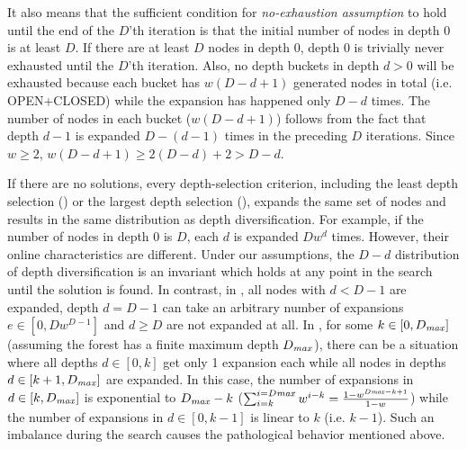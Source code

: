 It also means that the sufficient condition for \emph{no-exhaustion assumption} to hold until the end of the $D$'th
iteration is that the initial number of nodes in depth 0 is at least $D$.  If there are at least $D$ nodes in depth
0, depth 0 is trivially never exhausted until the $D$'th iteration. Also, no depth buckets in depth $d>0$ will be exhausted 
because each bucket has $w(D-d+1)$ generated nodes in total (i.e. OPEN+CLOSED) while the expansion has
happened only $D-d$ times.
The number of nodes in each bucket ($w(D-d+1)$) follows from the fact that  depth $d-1$ is expanded $D-(d-1)$ times in the preceding $D$ iterations.
Since $w\geq 2$, $w(D-d+1)\geq 2(D-d)+2>D-d$.

If there are no solutions, every depth-selection criterion, including the least depth selection (\fifo) or the largest depth selection (\lifo), expands the same set of nodes and results in the same distribution as depth diversification.
For example, if the number of nodes in depth 0 is $D$, each $d$ is expanded $Dw^d$ times.
However, their online characteristics are different.
Under our assumptions, the $D-d$ distribution of depth diversification is an invariant which holds at any point in the search until the solution is found.
In contrast, in \fifo, all nodes with $d<D-1$ are expanded, depth $d=D-1$ can take an arbitrary number of expansions $e \in [0, Dw^{D-1}]$ and $d\geq D$ are not expanded at all.
In \lifo, for some $k\in [0,D_\mit{max}]$ (assuming the forest has a finite maximum depth $D_\mit{max}$), there can be a situation where all depths $d \in [0,k]$ get only 1 expansion each
while all nodes in depths $d \in [k+1,D_\mit{max}]$ are expanded. In this case, the number of expansions in $d \in [k,D_\mit{max}]$ is exponential to $D_\mit{max}-k$ ($\sum_{i=k}^{i=D\mit{max}}w^{i-k}=\frac{1-w^{D\mit{max}-k+1}}{1-w}$) while the number of expansions in $d \in [0,k-1]$ is linear to $k$ (i.e. $k-1$). Such an imbalance during the search causes the pathological behavior mentioned above.


